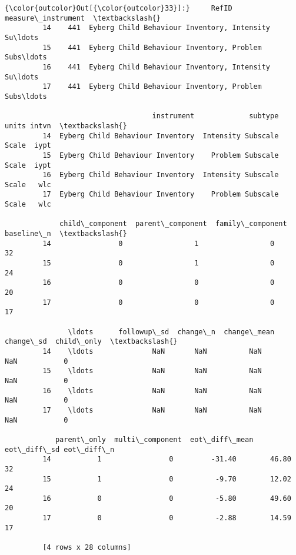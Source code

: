\documentclass{article}
\begin{document}
            \begin{Verbatim}[commandchars=\\\{\}]
{\color{outcolor}Out[{\color{outcolor}33}]:}     RefID                                 measure\_instrument  \textbackslash{}
         14    441  Eyberg Child Behaviour Inventory, Intensity Su\ldots   
         15    441  Eyberg Child Behaviour Inventory, Problem Subs\ldots   
         16    441  Eyberg Child Behaviour Inventory, Intensity Su\ldots   
         17    441  Eyberg Child Behaviour Inventory, Problem Subs\ldots   
         
                                   instrument             subtype  units intvn  \textbackslash{}
         14  Eyberg Child Behaviour Inventory  Intensity Subscale  Scale  iypt   
         15  Eyberg Child Behaviour Inventory    Problem Subscale  Scale  iypt   
         16  Eyberg Child Behaviour Inventory  Intensity Subscale  Scale   wlc   
         17  Eyberg Child Behaviour Inventory    Problem Subscale  Scale   wlc   
         
             child\_component  parent\_component  family\_component  baseline\_n  \textbackslash{}
         14                0                 1                 0          32   
         15                0                 1                 0          24   
         16                0                 0                 0          20   
         17                0                 0                 0          17   
         
               \ldots      followup\_sd  change\_n  change\_mean  change\_sd  child\_only  \textbackslash{}
         14    \ldots              NaN       NaN          NaN        NaN           0   
         15    \ldots              NaN       NaN          NaN        NaN           0   
         16    \ldots              NaN       NaN          NaN        NaN           0   
         17    \ldots              NaN       NaN          NaN        NaN           0   
         
            parent\_only  multi\_component  eot\_diff\_mean  eot\_diff\_sd eot\_diff\_n  
         14           1                0         -31.40        46.80         32  
         15           1                0          -9.70        12.02         24  
         16           0                0          -5.80        49.60         20  
         17           0                0          -2.88        14.59         17  
         
         [4 rows x 28 columns]
\end{Verbatim}
        
\end{document}
